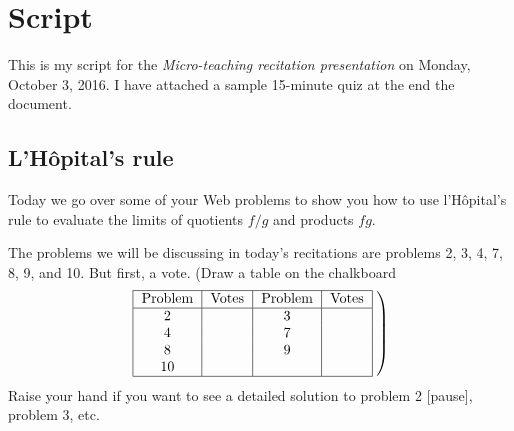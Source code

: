 \documentclass[article,oneside]{memoir}
\begin{document}
%

\author{\textti{\auth}}%
\title{\textti{\tight}}%
\date{\textti{\due}}%

\thispagestyle{empty}
\frontmatter
\maketitle%
\tableofcontents*%
\newpage

\mainmatter
\chapter{Script}
This is my script for the \emph{Micro-teaching recitation presentation} on
Monday, October 3, 2016. I have attached a sample 15-minute quiz at the end
the document.

\section{L'Hôpital's rule}
Today we go over some of your
\textsf{Web} problems to show you how
to use l'Hôpital's rule to evaluate the limits of quotients \(f/g\) and
products \(fg\).

The problems we will be discussing in today's recitations are problems 2,
3, 4, 7, 8, 9, and 10. But first, a vote. (Draw a table on the chalkboard
\[
  \left.
    \begin{tabular}{|c|c|c|c|}
  \hline
  Problem&Votes&
  Problem&Votes\\
  \hline
  2&&
  3&\\
  4&&
  7&\\
  8&&
  9&\\
  10&&&\\
  \hline
  \end{tabular}
  \;
  \right)
\]
Raise your hand if you want to
see a detailed solution to problem 2 [pause], problem 3, etc.
\end{document}
